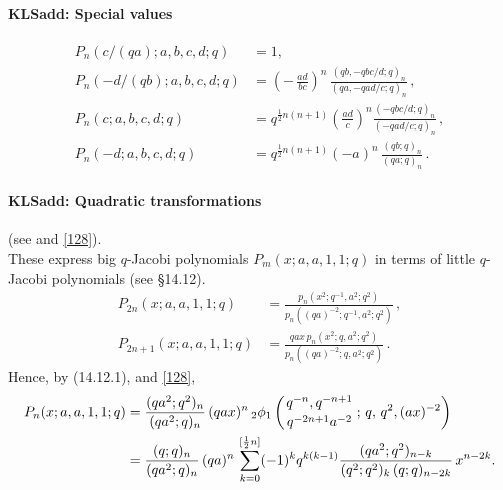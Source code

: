 \documentclass[envcountchap,graybox]{svmono}
\newcommand{\qhyp}[5]{\mbox{}_{#1}{\phi}_{#2}
\left(\genfrac{}{}{0pt}{}{#3}{#4}\,;\,q,\,#5\right)}
\newcommand\half{\frac12}
\newcommand{\qhyp}[5]{\,\mbox{}_{#1}\phi_{#2}\!\left(
  \genfrac{}{}{0pt}{}{#3}{#4};#5\right)}
\begin{document}
\paragraph{\large\bf KLSadd: Special values}\begin{align}
P_n(c/(qa);a,b,c,d;q)&=1,\\
P_n(-d/(qb);a,b,c,d;q)&=\left(-\,\frac{ad}{bc}\right)^n\,
\frac{(qb,-qbc/d;q)_n}{(qa,-qad/c;q)_n}\,,\\
P_n(c;a,b,c,d;q)&=
q^{\half n(n+1)}\left(\frac{ad}c\right)^n
\frac{(-qbc/d;q)_n}{(-qad/c;q)_n}\,,\\
P_n(-d;a,b,c,d;q)&=q^{\half n(n+1)} (-a)^n\,\frac{(qb;q)_n}{(qa;q)_n}\,.
\end{align}
%
\paragraph{\large\bf KLSadd: Quadratic transformations}(see \cite[(2.48), (2.49)]{K17} and \eqref{128}).\\
These express big $q$-Jacobi polynomials $P_m(x;a,a,1,1;q)$ in terms of little
$q$-Jacobi polynomials (see \S14.12).
\begin{align}
P_{2n}(x;a,a,1,1;q)&=\frac{p_n(x^2;q^{-1},a^2;q^2)}{p_n((qa)^{-2};q^{-1},a^2;q^2)}\,,
\label{130}\\
P_{2n+1}(x;a,a,1,1;q)&=\frac{qax\,p_n(x^2;q,a^2;q^2)}{p_n((qa)^{-2};q,a^2;q^2)}\,.
\label{131}
\end{align}
Hence, by (14.12.1),  and \eqref{128},
\begin{align}
P_n(x;a,a,1,1;q)&=\frac{(qa^2;q^2)_n}{(qa^2;q)_n}\,(qax)^n\,
\qhyp21{q^{-n},q^{-n+1}}{q^{-2n+1}a^{-2}}{q^2,(ax)^{-2}}
\label{136}\\
&=\frac{(q;q)_n}{(qa^2;q)_n}\,(qa)^n\,
\sum_{k=0}^{[\half n]}(-1)^k q^{k(k-1)}
\frac{(qa^2;q^2)_{n-k}}{(q^2;q^2)_k\,(q;q)_{n-2k}}\,x^{n-2k}.
\label{137}
\end{align}
%
\end{document}
